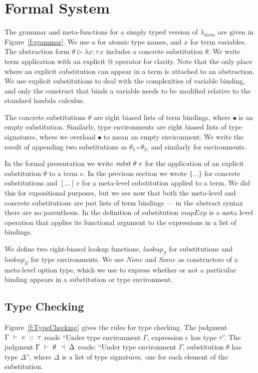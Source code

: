 
\section{Formal System}
The grammar and meta-functions for a simply typed version of $\lambda_{dsim}$ are given in Figure~\ref{f:grammar}. We use $a$ for atomic type names, and $x$ for term variables. The abstraction form $\theta \rhd \lambda x: \tau. e$ includes a concrete substitution $\theta$. We write term application with an explicit $@$ operator for clarity. Note that the only place where an explicit substitution can appear in a term is attached to an abstraction. We use explicit substitutions to deal with the complexities of variable binding, and only the construct that binds a variable needs to be modified relative to the standard lambda calculus.

The concrete substitutions $\theta$ are right biased lists of term bindings, where $\bullet$ is an empty substitution. Similarly, type environments are right biased lists of type signatures, where we overload $\bullet$ to mean an empty environment. We write the result of appending two substitutions as $\theta_1 \circ \theta_2$, and similarly for environments. 

In the formal presentation we write $\mathit{subst}~ \theta~ e$ for the application of an explicit substitution $\theta$ to a term $e$. In the previous section we wrote $\{...\}$ for concrete substitutions and $[...]~ e$ for a meta-level substitution applied to a term. We did this for expositional purposes, but we see now that both the meta-level and concrete substitutions are just lists of term bindings --- in the abstract syntax there are no parenthesis. In the definition of substitution $mapExp$ is a meta level operation that applies its functional argument to the expressions in a list of bindings. 

We define two right-biased lookup functions, $lookup_S$ for substitutions and $lookup_E$ for type environments. We use $None$ and $Some$ as constructors of a meta-level option type, which we use to express whether or not a particular binding appears in a substitution or type environment.


\subsection{Type Checking}
Figure~\ref{f:TypeChecking} gives the rules for type checking. The judgment $\Gamma ~\vdash~ e ~::~ \tau$ reads ``Under type environment $\Gamma$, expression $e$ has type $\tau$''. The judgment $\TypeS{\Gamma}{\theta}{\Delta}$ reads: ``Under type environment $\Gamma$, substitution $\theta$ has type $\Delta$'', where $\Delta$ is a list of type signatures, one for each element of the substitution.

